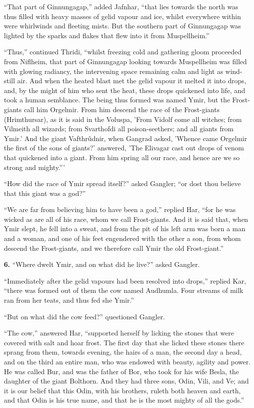 ``That part of Ginnungagap,'' added Jafnhar, ``that lies towards the
north was thus filled with heavy masses of gelid vapour and ice,
whilst everywhere within were whirlwinds and fleeting mists. But the
southern part of Ginnungagap was lighted by the sparks and flakes that
flew into it from Muspellheim.''

``Thus,'' continued Thridi, ``whilst freezing cold and gathering gloom
proceeded from Niflheim, that part of Ginnungagap looking towards
Muspellheim was filled with glowing radiancy, the intervening space
remaining calm and light as wind-still air. And when the heated blast
met the gelid vapour it melted it into drops, and, by the might of him
who sent the heat, these drops quickened into life, and took a human
semblance. The being thus formed was named Ymir, but the Frost-giants
call him Orgelmir. From him descend the race of the Frost-giants
(Hrimthursar), as it is said in the Voluspa, 'From Vidolf come all
witches; from Vilmeith all wizards; from Svarthofdi all
poison-seethers; and all giants from Ymir.' And the giant Vafthrûdnir,
when Gangrad asked, 'Whence came Orgelmir the first of the sons of
giants?' answered, 'The Elivagar cast out drops of venom that
quickened into a giant. From him spring all our race, and hence are we
so strong and mighty.'''

``How did the race of Ymir spread itself?'' asked Gangler; ``or dost thou
believe that this giant was a god?''

``We are far from believing him to have been a god,'' replied Har, ``for
he was wicked as are all of his race, whom we call Frost-giants. And
it is said that, when Ymir slept, he fell into a sweat, and from the
pit of his left arm was born a man and a woman, and one of his feet
engendered with the other a son, from whom descend the Frost-giants,
and we therefore call Ymir the old Frost-giant.''


\textbf{6.} ``Where dwelt Ymir, and on what did he live?'' asked Gangler.

``Immediately after the gelid vapours had been resolved into drops,''
replied Kar, ``there was formed out of them the cow named Audhumla.
Four streams of milk ran from her teats, and thus fed she Ymir.''

``But on what did the cow feed?'' questioned Gangler.

``The cow,'' answered Har, ``supported herself by licking the stones that
were covered with salt and hoar frost. The first day that she licked
these stones there sprang from them, towards evening, the hairs of a
man, the second day a head, and on the third an entire man, who was
endowed with beauty, agility and power. He was called Bur, and was the
father of Bor, who took for his wife Besla, the daughter of the giant
Bolthorn. And they had three sons, Odin, Vili, and Ve; and it is our
belief that this Odin, with his brothers, ruleth both heaven and
earth, and that Odin is his true name, and that he is the most mighty
of all the gods.''

